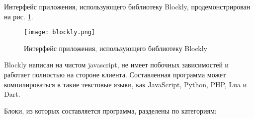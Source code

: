 Интерфейс приложения, использующего библиотеку Blockly, продемонстрирован на рис. \ref{fig:blockly}.

\begin{figure}[htbp]
	\centering
	\texttt{[image: blockly.png]}
	\caption{Интерфейс приложения, использующего библиотеку Blockly}%
	\label{fig:blockly}
\end{figure}

Blockly написан на чистом javascript, не имеет побочных зависимостей и работает полностью на стороне клиента. Составленная программа может компилироваться в такие текстовые языки, как JavaScript, Python, PHP, Lua и Dart.


Блоки, из которых составляется программа, разделены по категориям:


